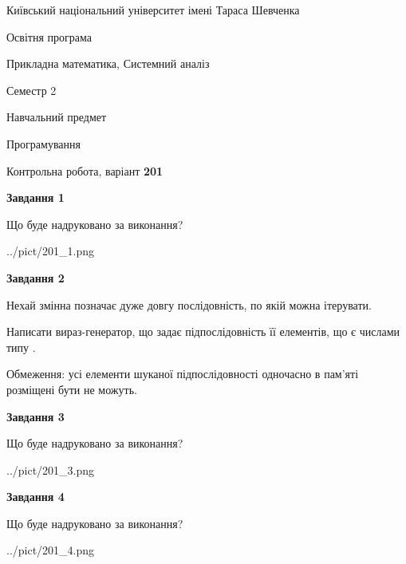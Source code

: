 \documentclass[12pt, ukrainian]{article}
\begin{document}
{{\begin {small}\par
{ \center  Київський національний університет імені Тараса Шевченка \par}
{\parbox {5 cm}{Освітня програма \hfill}{\parbox {8 cm}{Прикладна математика, Системний аналіз \hfill}}\parbox {5 cm}{\hfill Семестр 2}}\par
{\parbox {5 cm} {Навчальний предмет \hfill}\parbox {7 cm}{Програмування \hfill}\parbox {6cm}{\hfill}\par}\vspace{-7pt} \end{small}}{\center Контрольна робота, варіант  \No \textbf
{ 201 }\par}}
{
\begin {large}
{\begin {center}\textbf{Завдання 1}\end {center}}\par
Що буде надруковано за виконання?\par\par
\begin{center}
	{../pict/201_1.png}
\end{center}
\newpage

{\begin {center}\textbf{Завдання 2}\end {center}}\par
Нехай змінна  позначає дуже довгу послідовність, по якій можна ітерувати.

Написати вираз-генератор, що задає підпослідовність її елементів, що є числами типу .

Обмеження: усі елементи шуканої підпослідовності одночасно в пам'яті розміщені бути не можуть.\par
\newpage

{\begin {center}\textbf{Завдання 3}\end {center}}\par
Що буде надруковано за виконання?\par
\begin{center}
	{../pict/201_3.png}
\end{center}
\newpage

{\begin {center}\textbf{Завдання 4}\end {center}}\par
Що буде надруковано за виконання?\par
\begin{center}
	{../pict/201_4.png}
\end{center}
\newpage


\end{large}}
\end{document}
